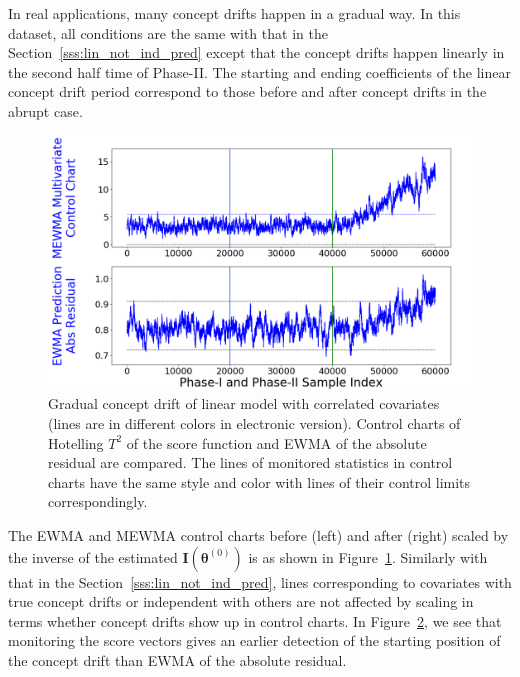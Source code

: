 \documentclass[twoside,11pt]{article}
\begin{document}
\begin{enumerate}[(I)]
\begin{figure}[!htbp]
  \label{fig:lin_reg_not_ind_X_grad_cd}
\end{figure}
In real applications, many concept drifts happen in a gradual way. In this dataset, all conditions are the same with that in the Section~\ref{sss:lin_not_ind_pred} except that the concept drifts happen linearly in the second half time of Phase-II. The starting and ending coefficients of the linear concept drift period correspond to those before and after concept drifts in the abrupt case. 
\begin{figure}[!htbp]
\centering
\includegraphics[width = 0.6\linewidth]{../figures/v14/sim_6/reg/1_sim6_lin_1e-08_0_005_1.png}
  \caption{Gradual concept drift of linear model with correlated covariates (lines are in different colors in electronic version). Control charts of Hotelling $T^2$ of the score function and EWMA of the absolute residual are compared. The lines of monitored statistics in control charts have the same style and color with lines of their control limits correspondingly.}
  \label{fig:lin_reg_ind_X_grad_cd_comp}
\end{figure}

The EWMA and MEWMA control charts before (left) and after (right) scaled by {the inverse of the estimated} ${\mathbf {I}}(\bm { \theta}^{(0)})$ is as shown in Figure~\ref{fig:lin_reg_not_ind_X_grad_cd}. Similarly with that in the Section~\ref{sss:lin_not_ind_pred}, lines corresponding to covariates with true concept drifts or independent with others are not affected by scaling in terms whether concept drifts show up in control charts. In Figure~\ref{fig:lin_reg_ind_X_grad_cd_comp}, we see that monitoring the score vectors gives an earlier detection of the starting position of the concept drift than EWMA of the absolute residual.
\end{enumerate}
\end{document}
